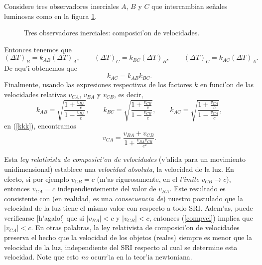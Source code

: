 Considere tres observadores inerciales $A$, $B$ y $C$ que intercambian se\~nales
luminosas como en la figura \ref{k3}.
\begin{figure}[!h]
\centerline{}
 \caption{Tres observadores inerciales: composici'on de velocidades.}
\label{k3}
\end{figure}
 Entonces tenemos que
\begin{equation}
(\Delta T)_B=k_{AB} (\Delta T)_A, \qquad (\Delta T)_C=k_{BC} (\Delta T)_B,
\qquad (\Delta T)_C=k_{AC} (\Delta T)_A.
\end{equation}
De aqu'i obtenemos que
\begin{equation}
k_{AC}=k_{AB}k_{BC}.\label{kkk}
\end{equation}
Finalmente, usando las expresiones respectivas de los factores $k$ en funci'on
de las velocidades relativas $v_{CA}$, $v_{BA}$ y $v_{CB}$, es decir,
\begin{equation}
k_{AB}=\sqrt{\frac{1+\frac{v_{BA}}{c}}{1-\frac{v_{BA}}{c}}}, \qquad k_{BC}=\sqrt{\frac{1+\frac{v_{CB}}{c}}{1-\frac{v_{CB}}{c}}} , \qquad k_{AC}=\sqrt{\frac{1+\frac{v_{CA}}{c}}{1-\frac{v_{CA}}{c}}},
\end{equation}
en (\ref{kkk}), encontramos
\begin{equation}
\boxed{v_{CA}=\frac{v_{BA}+v_{CB}}{1+\frac{v_{BA}v_{CB}}{c^2}}.} \label{compvel}
\end{equation}

Esta \textit{ley relativista de composici'on de velocidades} (v'alida para un movimiento unidimensional) establece una \textit{velocidad absoluta}, la
velocidad de la luz. En efecto, si por ejemplo $v_{CB}=c$ (m'as rigurosamente, en el \textit{l'imite} $v_{CB}\to c$), entonces $v_{CA}=c$ independientemente del valor de $v_{BA}$. Este resultado es consistente con (en realidad, es una \textit{consecuencia de}) nuestro postulado que la velocidad de la luz tiene el mismo valor con respecto a todo SRI. Adem'as, puede verificarse [h'agalo!] que si $|v_{BA}|<c$ y $|v_{CB}|<c$, entonces  (\ref{compvel}) implica que $|v_{CA}|<c$. En otras palabras, la ley relativista de composici'on de velocidades preserva el hecho que la velocidad de los objetos (reales) siempre es menor que la velocidad de la luz, independiente del SRI respecto al cual se determine esta velocidad. Note que esto \textit{no} ocurr'ia en la teor'ia newtoniana.



